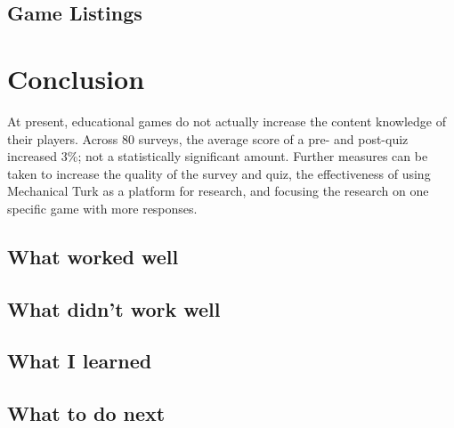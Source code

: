 \documentclass[12pt]{report}
\begin{document}
	\section{Game Listings}








	


\chapter{Conclusion}
	At present, educational games do not actually increase the content knowledge of their players. Across 80 surveys, the average score of a pre- and post-quiz increased 3\%; not a statistically significant amount. Further measures can be taken to increase the quality of the survey and quiz, the effectiveness of using Mechanical Turk as a platform for research, and focusing the research on one specific game with more responses.
	\section{What worked well}
	\section{What didn't work well}
	\section{What I learned}
	\section{What to do next}
\end{document}
